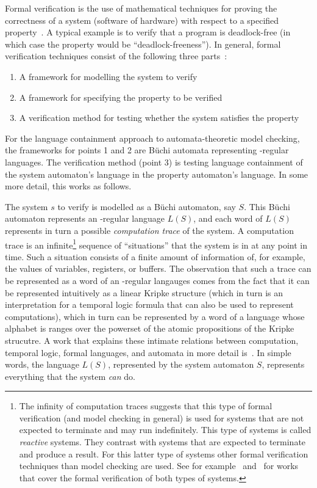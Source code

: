 Formal verification is the use of mathematical techniques for proving the correctness of a system (software of hardware) with respect to a specified property~\cite{2007_vardi_model_checking}. A typical example is to verify that a program is deadlock-free (in which case the property would be ``deadlock-freeness''). In general, formal verification techniques consist of the following three parts~\cite{huth2004logic}:

\begin{enumerate}
\item A framework for modelling the system to verify
\item A framework for specifying the property to be verified
\item A verification method for testing whether the system satisfies the property
\end{enumerate}

For the language containment approach to automata-theoretic model checking, the frameworks for points 1 and 2 are Büchi automata representing \om-regular languages. The verification method (point 3) is testing language containment of the system automaton's language in the property automaton's language. In some more detail, this works as follows.~\cite{1996_vardi}\cite{2007_vardi_model_checking}

The system $s$ to verify is modelled as a Büchi automaton, say $S$. This Büchi automaton represents an \om-regular language $L(S)$, and each word of $L(S)$ represents in turn a possible \textit{computation trace} of the system. A computation trace is an infinite\footnote{The infinity of computation traces suggests that this type of formal verification (and model checking in general) is used for systems that are not expected to terminate and  may run indefinitely. This type of systems is called \textit{reactive} systems. They contrast with systems that are expected to terminate and produce a result. For this latter type of systems other formal verification techniques than model checking are used. See for example~\cite{huth2004logic} and~\cite{ben2012mathematical} for works that cover the formal verification of both types of systems.} sequence of ``situations'' that the system is in at any point in time. Such a situation consists of a finite amount of information of, for example, the values of variables, registers, or buffers. The observation that such a trace can be represented as a word of an \om-regular langauges comes from the fact that it can be represented intuitively as a linear Kripke structure (which in turn is an interpretation for a temporal logic formula that can also be used to represent computations), which in turn can be represented by a word of a language whose alphabet is ranges over the powerset of the atomic propositions of the Kripke strucutre. A work that explains these intimate relations between computation, temporal logic, formal languages, and automata in more detail is~\cite{1996_vardi}. In simple words, the language $L(S)$, represented by the system automaton $S$, represents everything that the system \textit{can} do.

